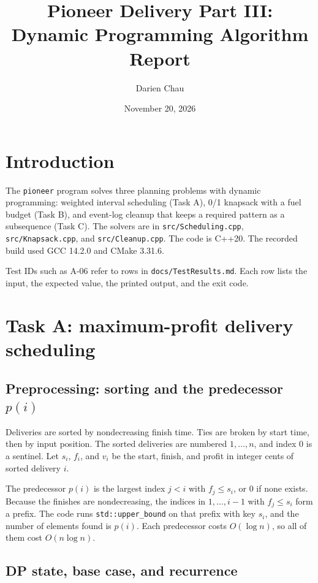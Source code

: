 \documentclass[11pt]{article}
\title{Pioneer Delivery Part III: Dynamic Programming Algorithm Report}
\author{Darien Chau}
\date{November 20, 2026}
\begin{document}
\maketitle

\section{Introduction}

The \texttt{pioneer} program solves three planning problems with dynamic programming:
weighted interval scheduling (Task A), 0/1 knapsack with a fuel budget (Task B), and event-log
cleanup that keeps a required pattern as a subsequence (Task C). The solvers are in
\texttt{src/Scheduling.cpp}, \texttt{src/Knapsack.cpp}, and \texttt{src/Cleanup.cpp}. The code is
C++20. The recorded build used GCC 14.2.0 and CMake 3.31.6.

Test IDs such as A-06 refer to rows in \texttt{docs/TestResults.md}. Each row lists the input,
the expected value, the printed output, and the exit code.

\section{Task A: maximum-profit delivery scheduling}

\subsection{Preprocessing: sorting and the predecessor \texorpdfstring{$p(i)$}{p(i)}}

Deliveries are sorted by nondecreasing finish time. Ties are broken by start time, then by input
position. The sorted deliveries are numbered $1, \ldots, n$, and index $0$ is a sentinel. Let
$s_i$, $f_i$, and $v_i$ be the start, finish, and profit in integer cents of sorted delivery $i$.

The predecessor $p(i)$ is the largest index $j < i$ with $f_j \le s_i$, or $0$ if none exists.
Because the finishes are nondecreasing, the indices in $1, \ldots, i-1$ with $f_j \le s_i$ form a
prefix. The code runs \texttt{std::upper\_bound} on that prefix with key $s_i$, and the number of
elements found is $p(i)$. Each predecessor costs $O(\log n)$, so all of them cost $O(n \log n)$.

\subsection{DP state, base case, and recurrence}
\end{document}

